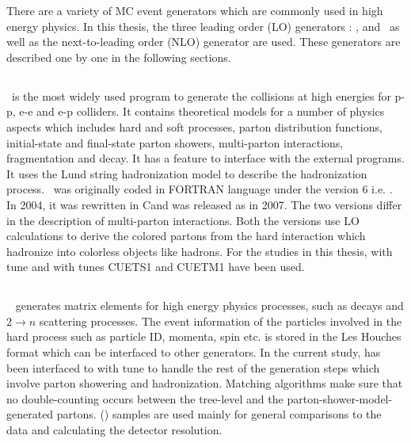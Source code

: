 There are a variety of MC event generators which are commonly used in high energy physics. In this thesis, the three leading order (LO) generators : \PYTHIA, \MadGraphF and \HERWIG~as well as the next-to-leading order (NLO) generator \POWHEG are used. These generators are described one by one in the following sections.

\subsection{\PYTHIA}
\PYTHIA~is the most widely used program to generate the collisions at high energies for p-p, e-e and e-p colliders. It contains theoretical models for a number of physics aspects which includes hard and soft processes, parton distribution functions, initial-state and final-state parton showers, multi-parton interactions, fragmentation and decay. It has a feature to interface with the external programs. It uses the Lund string hadronization model \cite{Lund} to describe the hadronization process. \PYTHIA~was originally coded in FORTRAN language under the version 6 i.e. \PYTHIAS \cite{Sjostrand:2006za}. In 2004, it was rewritten in C\plusn\plus and was released as \PYTHIAE \cite{Sjostrand:2007gs} in 2007. The two versions differ in the description of multi-parton interactions. Both the versions use LO calculations to derive the colored partons from the hard interaction which hadronize into colorless objects like hadrons. For the studies in this thesis, \PYTHIAS with tune \Ztwostar \cite{Field:2011iq} and \PYTHIAE with tunes CUETS1 and CUETM1 \cite{Khachatryan:2015pea} have been used. 

\subsection{\MadGraphF}
\MadGraphF~\cite{Alwall:2011uj} generates matrix elements for high energy physics processes, such as decays and $2 \rightarrow n$ scattering processes. The event information of the particles involved in the hard process such as particle ID, momenta, spin etc. is stored in the Les Houches format \cite{Alwall:2006yp} which can be interfaced to other generators. In the current study, \MadGraphF has been interfaced to \PYTHIAS with tune \Ztwostar to handle the rest of the generation steps which involve parton showering and hadronization. Matching algorithms make sure that no double-counting occurs between the tree-level and the parton-shower-model-generated partons. \MadGraphFn\plusn \PYTHIAS (\MGP) samples are used mainly for general comparisons to the data and calculating the detector resolution. 

